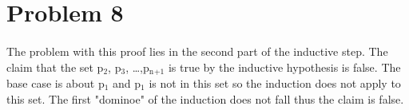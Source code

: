 \documentclass[11pt]{article}
\begin{document}
\section{Problem 8}
\label{sec:org5d40c96}
\paragraph{}
The problem with this proof lies in the second part of the inductive step.  The claim that the set p\(_{\text{2}}\), p\(_{\text{3}}\), \ldots{},p\(_{\text{n}}\)\(_{\text{+1}}\) is true by the inductive hypothesis is false. The base case is about p\(_{\text{1}}\) and p\(_{\text{1}}\) is not in this set so the induction does not apply to this set. The first "dominoe" of the induction does not fall thus the claim is false. 
\end{document}
